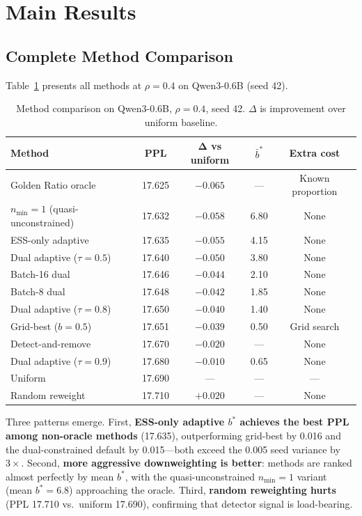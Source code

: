 \documentclass[11pt]{article}
\begin{document}
\section{Main Results}
\label{sec:main_results}

\subsection{Complete Method Comparison}

Table~\ref{tab:main} presents all methods at $\rho = 0.4$ on Qwen3-0.6B (seed 42).

\begin{table}[h]
\centering
\caption{Method comparison on Qwen3-0.6B, $\rho = 0.4$, seed 42. $\Delta$ is improvement over uniform baseline.}
\label{tab:main}
\begin{tabular}{lcccc}
\toprule
\textbf{Method} & \textbf{PPL} & $\boldsymbol{\Delta}$ \textbf{vs uniform} & \textbf{$\bar{b}^*$} & \textbf{Extra cost} \\
\midrule
Golden Ratio oracle & 17.625 & $-0.065$ & --- & Known proportion \\
$n_{\min}=1$ (quasi-unconstrained) & 17.632 & $-0.058$ & 6.80 & None \\
ESS-only adaptive & 17.635 & $-0.055$ & 4.15 & None \\
Dual adaptive ($\tau = 0.5$) & 17.640 & $-0.050$ & 3.80 & None \\
Batch-16 dual & 17.646 & $-0.044$ & 2.10 & None \\
Batch-8 dual & 17.648 & $-0.042$ & 1.85 & None \\
Dual adaptive ($\tau = 0.8$) & 17.650 & $-0.040$ & 1.40 & None \\
Grid-best ($b = 0.5$) & 17.651 & $-0.039$ & 0.50 & Grid search \\
Detect-and-remove & 17.670 & $-0.020$ & --- & None \\
Dual adaptive ($\tau = 0.9$) & 17.680 & $-0.010$ & 0.65 & None \\
Uniform & 17.690 & --- & --- & --- \\
Random reweight & 17.710 & $+0.020$ & --- & None \\
\bottomrule
\end{tabular}
\end{table}

Three patterns emerge. First, \textbf{ESS-only adaptive $b^*$ achieves the best PPL among non-oracle methods} (17.635), outperforming grid-best by 0.016 and the dual-constrained default by 0.015---both exceed the 0.005 seed variance by $3\times$. Second, \textbf{more aggressive downweighting is better}: methods are ranked almost perfectly by mean $b^*$, with the quasi-unconstrained $n_{\min}=1$ variant (mean $b^* = 6.8$) approaching the oracle. Third, \textbf{random reweighting hurts} (PPL 17.710 vs.\ uniform 17.690), confirming that detector signal is load-bearing.
\end{document}
